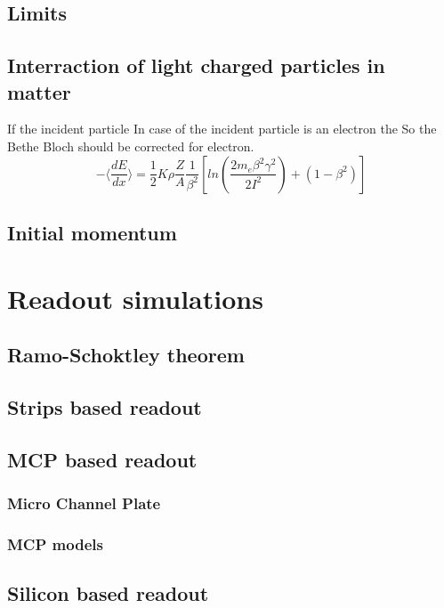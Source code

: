 \begin{refsection}
	\subsection{Limits}

	\subsection{Interraction of light charged particles in matter}
	If the incident particle
	In case of the incident particle is an electron the
	So the Bethe Bloch should be corrected for electron.\cite{Rieke1972}
	\begin{equation}
		- \bigg \langle \frac{dE}{dx} \bigg \rangle = \frac{1}{2} K \rho \frac{Z}{A} \frac{1}{\beta^{2}} \left[ln \left(\frac{2 m_{e} \beta^{2} \gamma^{2}}{2I^{2}} \right) + (1 - \beta^{2})\right]
	\end{equation}
	\subsection{Initial momentum}
	
	\section{Readout simulations}
	\subsection{Ramo-Schoktley theorem}
	\cite[]{Ramo_1939}\cite[]{Shockley_1938}\cite[]{Cavalleri1971}\cite[]{Jen1941}
	\subsection{Strips based readout}
	\subsection{MCP based readout}
	\subsubsection{Micro Channel Plate}
	\subsubsection{MCP models}
	\subsection{Silicon based readout}
	
	


\end{refsection}
